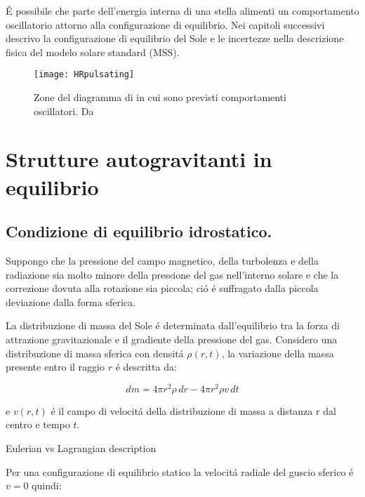 \documentclass[../main.tex]{subfiles}
\begin{document}
\begingroup
\color{midnightblue}
\'E possibile che parte dell'energia interna di una stella alimenti un comportamento oscillatorio attorno alla configurazione di equilibrio. Nei capitoli successivi descrivo la configurazione di equilibrio del Sole e le incertezze nella descrizione fisica del modelo solare standard (MSS).

\endgroup


\begin{figure}[!hb]
    \centering
    \texttt{[image: HRpulsating]}
    \caption{Zone del diagramma di \hr{} in cui sono previsti comportamenti oscillatori. Da \cite{chr97lecture}}
    \label{fig:HRp}
\end{figure}


\clearpage


{\let\clearpage\relax \chapter{Strutture autogravitanti in equilibrio}}


\section{Condizione di equilibrio idrostatico.}

\begingroup
\color{midnightblue}
Suppongo che la pressione del campo magnetico, della turbolenza e della radiazione sia molto minore della pressione del gas nell'interno solare e che la correzione dovuta alla rotazione sia piccola; ci\'o \'e suffragato dalla piccola deviazione dalla forma sferica.
\endgroup

La distribuzione di massa del Sole \'e determinata dall'equilibrio tra la forza di attrazione gravitazionale e il gradiente della pressione del gas. Considero una distribuzione di massa sferica con densit\'a $\rho(r,t)$, la variazione della massa presente entro il raggio $r$ \'e descritta da:

\begin{equation}
dm=4\pi r^2\rho \,dr-4\pi r^2\rho v\,dt\label{eq:massvar}
\end{equation}

e $v(r,t)$ \'e il campo di velocit\'a della distribuzione di massa a distanza r dal centro e tempo $t$.

\begingroup
\color{midnightblue}
Eulerian vs Lagrangian description
\endgroup

Per una configurazione di equilibrio statico la velocit\'a radiale del guscio sferico \'e $v=0$ quindi:
\end{document}
